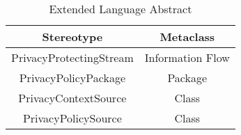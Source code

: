 \begin{table}[h!]
\centering
	\begin{tabular}{||c|c||} 
	\hline\hline
	Stereotype & Metaclass \\ [1ex] 
	\hline\hline
	PrivacyProtectingStream & Information Flow  \\
	\hline
	PrivacyPolicyPackage & Package  \\
	\hline
	PrivacyContextSource & Class  \\
	\hline
	PrivacyPolicySource & Class  \\
	\hline\hline
	\end{tabular}
\caption{Extended Language Abstract}
\label{Extended Language Abstract}
\end{table}


